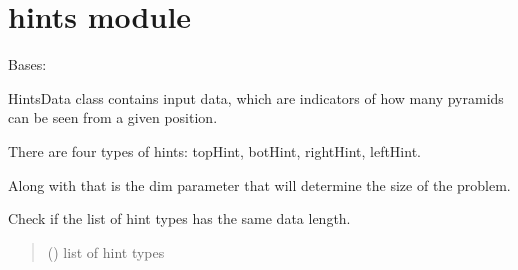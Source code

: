 \documentclass[letterpaper,10pt,english]{sphinxmanual}
\begin{document}
\sphinxstepscope


\section{hints module}
\label{\detokenize{hints:module-hints}}\label{\detokenize{hints:hints-module}}\label{\detokenize{hints::doc}}

\begin{fulllineitems}
\label{\detokenize{hints:hints.HintsData}}
\pysigstartsignatures
{}
\pysigstopsignatures
\sphinxAtStartPar
Bases: 

\sphinxAtStartPar
HintsData class contains input data, which are indicators of
how many pyramids can be seen from a given position.

\sphinxAtStartPar
There are four types of hints: topHint, botHint, rightHint, leftHint.

\sphinxAtStartPar
Along with that is the dim parameter that will determine the size of
the problem.

\begin{fulllineitems}
\label{\detokenize{hints:hints.HintsData.checkDim}}
\pysigstartsignatures
{}
\pysigstopsignatures
\sphinxAtStartPar
Check if the list of hint types has the same data length.
\begin{quote}\begin{description}
\sphinxAtStartPar
{} () \textendash{} list of hint types


\end{description}
\end{quote}
\end{fulllineitems}
\end{fulllineitems}
\end{document}
